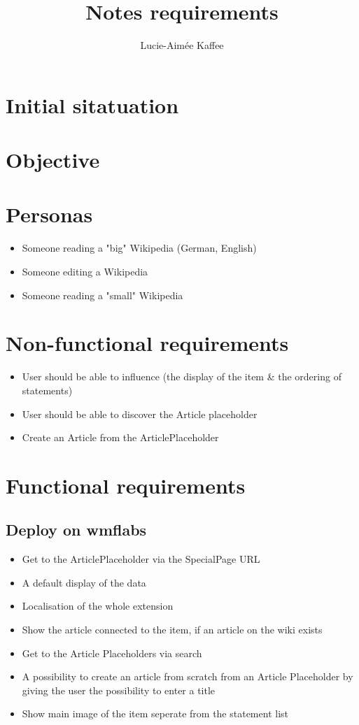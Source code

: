 \documentclass[11pt]{article}
\title {{Notes requirements}}
\author {Lucie-Aimée Kaffee}
\begin{document}
\section{Initial sitatuation}

\section{Objective}

\section{Personas}

\begin{itemize}
\item Someone reading a "big" Wikipedia (German, English)
\item Someone editing a Wikipedia
\item Someone reading a "small" Wikipedia 
\end{itemize}

\section{Non-functional requirements}

\begin{itemize}
\item User should be able to influence (the display of the item \& the ordering of statements)
\item User should be able to discover the Article placeholder
\item Create an Article from the ArticlePlaceholder
\end{itemize}

\section{Functional requirements}

\subsection[wmflabs]{Deploy on wmflabs}
\begin{itemize}
\item Get to the ArticlePlaceholder via the SpecialPage URL
\item A default display of the data
\item Localisation of the whole extension
\item Show the article connected to the item, if an article on the wiki exists
\item Get to the Article Placeholders via search
\item A possibility to create an article from scratch from an Article Placeholder by giving the user the possibility to enter a title
\item Show main image of the item seperate from the statement list
\end{itemize}
\end{document}
